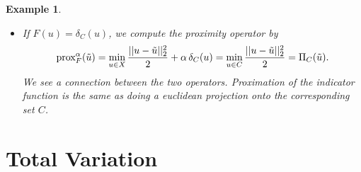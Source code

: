 \documentclass[abstracton]{scrreprt}
\newtheorem{example}[theorem]{Example}
\begin{document}
\begin{example}
\begin{itemize}
\begin{enumerate}
\begin{equation}
\begin{array}{l l}
                                       1 & \textnormal{otherwise}
                                    \end{array}
                                \right. .
                                \notag
                            \end{equation}
                    \end{enumerate}
                \item If $F(u) = \delta_{C}(u)$, we compute the proximity operator by
                $$
                    \textnormal{prox}^{\alpha}_{F}(\tilde{u}) = \min\limits_{u \in X} \frac{||u - \tilde{u}||_{2}^{2}}{2} + \alpha \, \delta_{C}(u) = \min\limits_{u \in C} \frac{||u - \tilde{u}||_{2}^{2}}{2} = \Pi_{C}(\tilde{u}).
                $$
                We see a connection between the two operators. Proximation of the indicator function is the same as doing a euclidean projection onto the corresponding set $C$.
            \end{itemize}
        \end{example}
    \section{Total Variation} %
    \label{sec:total_variation}
        
\end{document}
